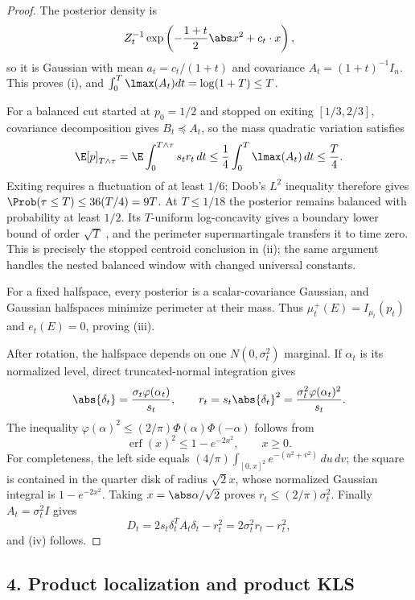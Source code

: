 \documentclass[../main.tex]{subfiles}
\begin{document}
\begin{proof}
The posterior density is
\[
  Z_t^{-1}\exp\left(-\frac{1+t}{2}\abs x^2+c_t\cdot x\right),
\]
so it is Gaussian with mean $a_t=c_t/(1+t)$ and covariance
$A_t=(1+t)^{-1}I_n$.  This proves (i), and
$\int_0^T\lmax(A_t)dt=\log(1+T)\le T$.

For a balanced cut started at $p_0=1/2$ and stopped on exiting $[1/3,2/3]$, covariance
decomposition gives $B_t\preceq A_t$, so the mass quadratic variation satisfies
\[
  \E[p]_{T\wedge\tau}
  =\E\int_0^{T\wedge\tau}s_tr_t\,dt
  \le\frac14\int_0^T\lmax(A_t)\,dt\le\frac T4.
\]
Exiting requires a fluctuation of at least $1/6$; Doob's $L^2$ inequality therefore gives
$\Prob(\tau\le T)\le36(T/4)=9T$.  At $T\le1/18$ the posterior remains balanced with probability
at least $1/2$.  Its $T$-uniform log-concavity gives a boundary lower bound of order $\sqrt T$
\cite{BakryGentilLedoux2014,Bobkov1999LogConcave,Milman2009Isoperimetric},
and the perimeter supermartingale transfers it to time zero.  This is precisely the stopped
centroid conclusion in (ii); the same argument handles the nested balanced window with changed
universal constants.

For a fixed halfspace, every posterior is a scalar-covariance Gaussian, and Gaussian halfspaces
minimize perimeter at their mass.  Thus
$\mu_t^+(E)=I_{\mu_t}(p_t)$ and $e_t(E)=0$, proving (iii).

After rotation, the halfspace depends on one $N(0,\sigma_t^2)$ marginal.  If $\alpha_t$ is its
normalized level, direct truncated-normal integration gives
\[
  \abs{\delta_t}=\frac{\sigma_t\varphi(\alpha_t)}{s_t},
  \qquad r_t=s_t\abs{\delta_t}^2
       =\frac{\sigma_t^2\varphi(\alpha_t)^2}{s_t}.
\]
The inequality $\varphi(\alpha)^2\le(2/\pi)\Phi(\alpha)\Phi(-\alpha)$ follows from
\[
  \operatorname{erf}(x)^2\le1-e^{-2x^2},\qquad x\ge0.
\]
For completeness, the left side equals
$(4/\pi)\int_{[0,x]^2}e^{-(u^2+v^2)}\,du\,dv$; the square is contained in the quarter disk of
radius $\sqrt2x$, whose normalized Gaussian integral is $1-e^{-2x^2}$.  Taking
$x=\abs\alpha/\sqrt2$ proves $r_t\le(2/\pi)\sigma_t^2$.  Finally $A_t=\sigma_t^2I$ gives
\[
  D_t=2s_t\delta_t^TA_t\delta_t-r_t^2
     =2\sigma_t^2r_t-r_t^2,
\]
and (iv) follows.
\end{proof}

\subsection*{4. Product localization and product KLS}
\end{document}

